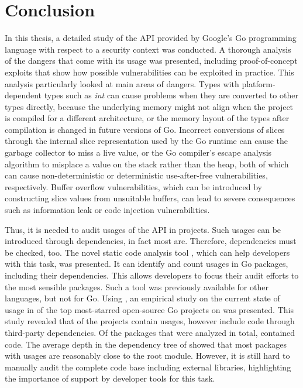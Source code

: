 
\chapter{Conclusion}\label{ch:conclusion}

In this thesis, a detailed study of the \unsafe{} \acrshort{API} provided by Google's Go programming language with
respect to a security context was conducted.
A thorough analysis of the dangers that come with its usage was presented, including proof-of-concept exploits that show
how possible vulnerabilities can be exploited in practice.
This analysis particularly looked at  main areas of dangers.
Types with platform-dependent types such as \textit{int} can cause problems when they are converted to other types
directly, because the underlying memory might not align when the project is compiled for a different architecture, or
the memory layout of the types after compilation is changed in future versions of Go.
Incorrect conversions of slices through the internal slice representation used by the Go runtime can cause the garbage
collector to miss a live value, or the Go compiler's escape analysis algorithm to misplace a value on the stack rather
than the heap, both of which can cause non-deterministic or deterministic use-after-free vulnerabilities, respectively.
Buffer overflow vulnerabilities, which can be introduced by constructing slice values from unsuitable buffers, can lead
to severe consequences such as information leak or code injection vulnerabilities.

Thus, it is needed to audit usages of the \unsafe{} API in projects.
Such usages can be introduced through dependencies, in fact most are.
Therefore, dependencies must be checked, too.
The novel static code analysis tool \toolGeiger{}, which can help developers with this task, was presented.
It can identify and count \unsafe{} usages in Go packages, including their dependencies.
This allows developers to focus their \unsafe{} audit efforts to the most sensible packages.
Such a tool was previously available for other languages, but not for Go.
Using \toolGeiger{}, an empirical study on the current state of \unsafe{} usage in \projsAnalyzed{} of the top
\projsTotal{} most-starred open-source Go projects on \github{} was presented.
This study revealed that \percentageUnsafeProjects{} of the projects contain \unsafe{} usages, however
\percentageUnsafeTransitiveWithDependencies{} include \unsafe{} code through third-party dependencies.
Of the \packagesAnalyzed{} packages that were analyzed in total, \percentageUnsafePackages{} contained \unsafe{} code.
The average depth in the dependency tree of \averageUnsafeImportDepth{} showed that most packages with \unsafe{} usages
are reasonably close to the root module.
However, it is still hard to manually audit the complete code base including external libraries, highlighting the
importance of support by developer tools for this task.

